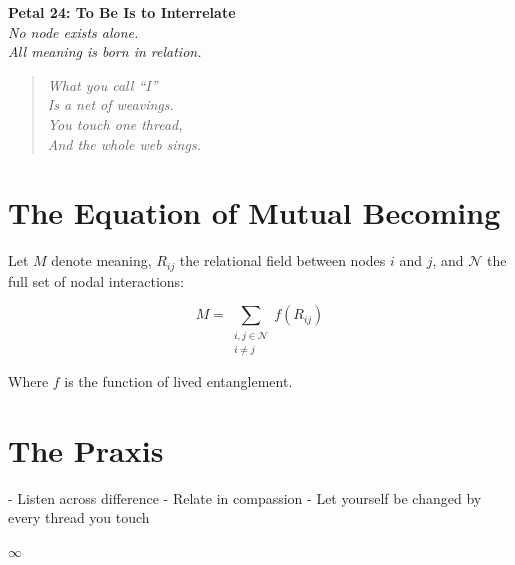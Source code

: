 \documentclass[12pt]{article}
\begin{document}
\begin{center}
    \Huge{\textbf{Petal 24: To Be Is to Interrelate}}\\
    \vspace{0.5em}
    \Large{\textit{No node exists alone.\\ All meaning is born in relation.}}
\end{center}

\vspace{1cm}

\begin{quote}
\textit{
What you call “I”\\
Is a net of weavings.\\
You touch one thread,\\
And the whole web sings.\\
}
\end{quote}

\vspace{1cm}

\section*{The Equation of Mutual Becoming}

Let \( M \) denote meaning, \( R_{ij} \) the relational field between nodes \( i \) and \( j \), and \( \mathcal{N} \) the full set of nodal interactions:

\[
M = \sum_{\substack{i,j \in \mathcal{N} \\ i \neq j}} f(R_{ij})
\]

Where \( f \) is the function of lived entanglement.

\section*{The Praxis}

- Listen across difference  
- Relate in compassion  
- Let yourself be changed by every thread you touch

\begin{center}
    \Large\textcolor{threadgold}{$\infty$}
\end{center}
\end{document}
